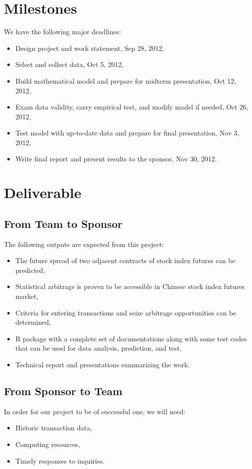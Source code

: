 \documentclass[12pt,letterpaper]{article}
\theoremstyle{definition}
\begin{document}
\section{Milestones}
We have the following major deadlines:
\begin{itemize}
    \item Design project and work statement, Sep 28, 2012,
    \item Select and collect data, Oct 5, 2012,
    \item Build mathematical model and prepare for midterm presentation, Oct 12, 2012,
    \item Exam data validity, carry empirical test, and modify model if needed, Oct 26, 2012,
    \item Test model with up-to-date data and prepare for final presentation, Nov 3, 2012,
    \item Write final report and present results to the sponsor, Nov 30, 2012.
\end{itemize}

\section{Deliverable}
\subsection{From Team to Sponsor} %
The following outputs are expected from this project:
\begin{itemize}
    \item The future spread of two adjacent contracts of stock index futures can be predicted, 
    \item Statistical arbitrage is proven to be accessible in Chinese stock index futures market,
    \item Criteria for entering transactions and seize arbitrage opportunities can be determined,
    \item	R package with a complete set of documentations along with some test codes that can be used for data analysis, prediction, and test,
    \item Technical report and presentations summarizing the work.
\end{itemize}

\subsection{From Sponsor to Team} %

In order for our project to be of successful one, we will need:
\begin{itemize}
    \item Historic transaction data,
    \item Computing resources,
    \item Timely responses to inquiries.
\end{itemize}


%
%
\end{document}
